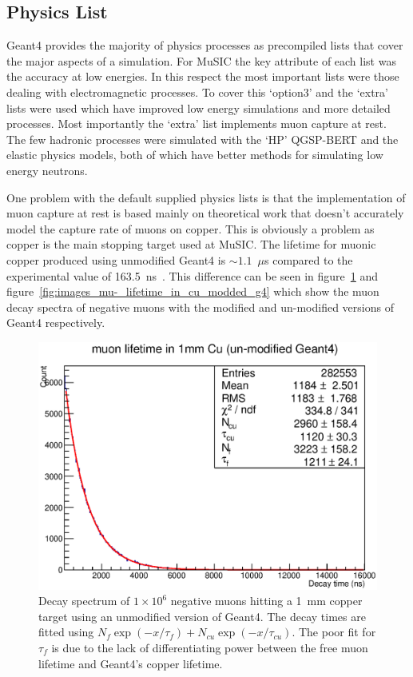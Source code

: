 \subsection{Physics List} %
\label{sec:physics_list}
Geant4 provides the majority of physics processes as precompiled lists that cover the major aspects of a simulation. For MuSIC the key attribute of each list was the accuracy at low energies. In this respect the most important lists were those dealing with electromagnetic processes. To cover this `option3' and the `extra' lists were used which have improved low energy simulations and more detailed processes. Most importantly the `extra' list implements muon capture at rest. The few hadronic processes were simulated with the `HP' QGSP-BERT and the elastic physics models, both of which have better methods for simulating low energy neutrons.

One problem with the default supplied physics lists is that the implementation of muon capture at rest is based mainly on theoretical work that doesn't accurately model the capture rate of muons on copper. This is obviously a problem as copper is the main stopping target used at MuSIC. The lifetime for muonic copper produced using unmodified Geant4 is \(\sim1.1\)~\(\mu\)s compared to the experimental value of 163.5~ns~\cite{suzuki_mu_capture_rates}. This difference can be seen in  figure~\ref{fig:images_mu-_lifetime_in_cu_unmodded_g4} and figure~\ref{fig:images_mu-_lifetime_in_cu_modded_g4} which show the muon decay spectra of negative muons with the modified and un-modified versions of Geant4 respectively. 
\begin{figure}[hptb]
  \centering
    \includegraphics[width=.8\textwidth]{images/mu-_lifetime_in_cu_unmodded_g4.eps}
  \caption{Decay spectrum of \(1\times10^6\) negative muons hitting a 1~mm copper target using an unmodified version of Geant4. The decay times are fitted using \(N_f\exp(-x/\tau_f) +  N_{cu}\exp(-x/\tau_{cu})\). The poor fit for \(\tau_f\) is due to the lack of differentiating power between the free muon lifetime and Geant4's copper lifetime.}
  \label{fig:images_mu-_lifetime_in_cu_unmodded_g4}
\end{figure}

